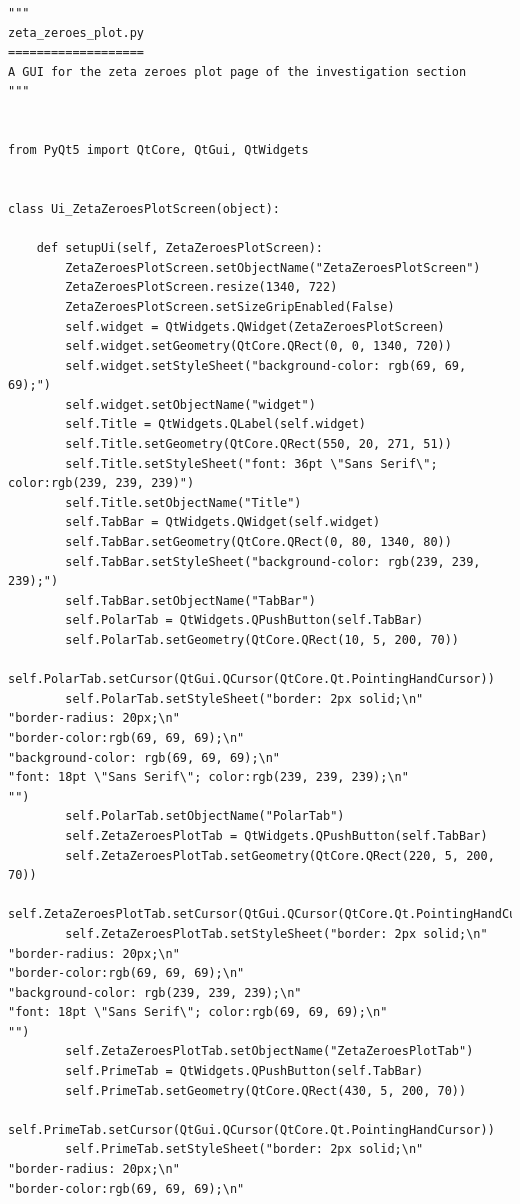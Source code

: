 \documentclass{article}
\begin{document}
\begin{lstlisting}
"""
zeta_zeroes_plot.py
===================
A GUI for the zeta zeroes plot page of the investigation section
"""


from PyQt5 import QtCore, QtGui, QtWidgets


class Ui_ZetaZeroesPlotScreen(object):

    def setupUi(self, ZetaZeroesPlotScreen):
        ZetaZeroesPlotScreen.setObjectName("ZetaZeroesPlotScreen")
        ZetaZeroesPlotScreen.resize(1340, 722)
        ZetaZeroesPlotScreen.setSizeGripEnabled(False)
        self.widget = QtWidgets.QWidget(ZetaZeroesPlotScreen)
        self.widget.setGeometry(QtCore.QRect(0, 0, 1340, 720))
        self.widget.setStyleSheet("background-color: rgb(69, 69, 69);")
        self.widget.setObjectName("widget")
        self.Title = QtWidgets.QLabel(self.widget)
        self.Title.setGeometry(QtCore.QRect(550, 20, 271, 51))
        self.Title.setStyleSheet("font: 36pt \"Sans Serif\"; color:rgb(239, 239, 239)")
        self.Title.setObjectName("Title")
        self.TabBar = QtWidgets.QWidget(self.widget)
        self.TabBar.setGeometry(QtCore.QRect(0, 80, 1340, 80))
        self.TabBar.setStyleSheet("background-color: rgb(239, 239, 239);")
        self.TabBar.setObjectName("TabBar")
        self.PolarTab = QtWidgets.QPushButton(self.TabBar)
        self.PolarTab.setGeometry(QtCore.QRect(10, 5, 200, 70))
        self.PolarTab.setCursor(QtGui.QCursor(QtCore.Qt.PointingHandCursor))
        self.PolarTab.setStyleSheet("border: 2px solid;\n"
"border-radius: 20px;\n"
"border-color:rgb(69, 69, 69);\n"
"background-color: rgb(69, 69, 69);\n"
"font: 18pt \"Sans Serif\"; color:rgb(239, 239, 239);\n"
"")
        self.PolarTab.setObjectName("PolarTab")
        self.ZetaZeroesPlotTab = QtWidgets.QPushButton(self.TabBar)
        self.ZetaZeroesPlotTab.setGeometry(QtCore.QRect(220, 5, 200, 70))
        self.ZetaZeroesPlotTab.setCursor(QtGui.QCursor(QtCore.Qt.PointingHandCursor))
        self.ZetaZeroesPlotTab.setStyleSheet("border: 2px solid;\n"
"border-radius: 20px;\n"
"border-color:rgb(69, 69, 69);\n"
"background-color: rgb(239, 239, 239);\n"
"font: 18pt \"Sans Serif\"; color:rgb(69, 69, 69);\n"
"")
        self.ZetaZeroesPlotTab.setObjectName("ZetaZeroesPlotTab")
        self.PrimeTab = QtWidgets.QPushButton(self.TabBar)
        self.PrimeTab.setGeometry(QtCore.QRect(430, 5, 200, 70))
        self.PrimeTab.setCursor(QtGui.QCursor(QtCore.Qt.PointingHandCursor))
        self.PrimeTab.setStyleSheet("border: 2px solid;\n"
"border-radius: 20px;\n"
"border-color:rgb(69, 69, 69);\n"

\end{lstlisting}
\end{document}
